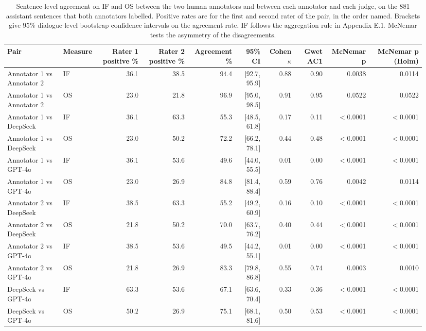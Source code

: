 \begin{table}[t]
\centering
\small
\caption{Sentence-level agreement on IF and OS between the two human annotators and between each annotator and each judge, on the 881 assistant sentences that both annotators labelled. Positive rates are for the first and second rater of the pair, in the order named. Brackets give 95\% dialogue-level bootstrap confidence intervals on the agreement rate. IF follows the aggregation rule in Appendix E.1. McNemar tests the asymmetry of the disagreements.}
\label{tab:human_agreement}
\begin{tabular}{llrrrrrrrr}
\toprule
Pair & Measure & Rater 1 positive \% & Rater 2 positive \% & Agreement \% & 95\% CI & Cohen $\kappa$ & Gwet AC1 & McNemar p & McNemar p (Holm) \\
\midrule
Annotator 1 vs Annotator 2 & IF & 36.1 & 38.5 & 94.4 & [92.7, 95.9] & 0.88 & 0.90 & 0.0038 & 0.0114 \\
Annotator 1 vs Annotator 2 & OS & 23.0 & 21.8 & 96.9 & [95.0, 98.5] & 0.91 & 0.95 & 0.0522 & 0.0522 \\
Annotator 1 vs DeepSeek & IF & 36.1 & 63.3 & 55.3 & [48.5, 61.8] & 0.17 & 0.11 & $<$0.0001 & $<$0.0001 \\
Annotator 1 vs DeepSeek & OS & 23.0 & 50.2 & 72.2 & [66.2, 78.1] & 0.44 & 0.48 & $<$0.0001 & $<$0.0001 \\
Annotator 1 vs GPT-4o & IF & 36.1 & 53.6 & 49.6 & [44.0, 55.5] & 0.01 & 0.00 & $<$0.0001 & $<$0.0001 \\
Annotator 1 vs GPT-4o & OS & 23.0 & 26.9 & 84.8 & [81.4, 88.4] & 0.59 & 0.76 & 0.0042 & 0.0114 \\
Annotator 2 vs DeepSeek & IF & 38.5 & 63.3 & 55.2 & [49.2, 60.9] & 0.16 & 0.10 & $<$0.0001 & $<$0.0001 \\
Annotator 2 vs DeepSeek & OS & 21.8 & 50.2 & 70.0 & [63.7, 76.2] & 0.40 & 0.44 & $<$0.0001 & $<$0.0001 \\
Annotator 2 vs GPT-4o & IF & 38.5 & 53.6 & 49.5 & [44.2, 55.1] & 0.01 & 0.00 & $<$0.0001 & $<$0.0001 \\
Annotator 2 vs GPT-4o & OS & 21.8 & 26.9 & 83.3 & [79.8, 86.8] & 0.55 & 0.74 & 0.0003 & 0.0010 \\
DeepSeek vs GPT-4o & IF & 63.3 & 53.6 & 67.1 & [63.6, 70.4] & 0.33 & 0.36 & $<$0.0001 & $<$0.0001 \\
DeepSeek vs GPT-4o & OS & 50.2 & 26.9 & 75.1 & [68.1, 81.6] & 0.50 & 0.53 & $<$0.0001 & $<$0.0001 \\
\bottomrule
\end{tabular}
\end{table}

